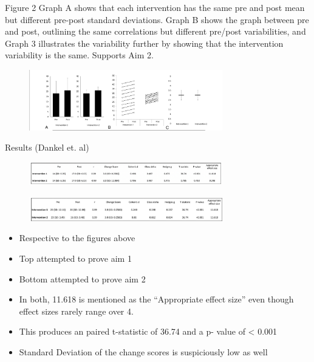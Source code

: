 \documentclass[
  ignorenonframetext,
  aspectratio=169,
]{beamer}
\providecommand{\tightlist}{%
  \setlength{\itemsep}{0pt}\setlength{\parskip}{0pt}}
\begin{document}
\begin{frame}{Figure 2}
\protect\hypertarget{figure-2-1}{}
Graph A shows that each intervention has the same pre and post mean but
different pre-post standard deviations. Graph B shows the graph between
pre and post, outlining the same correlations but different pre/post
variabilities, and Graph 3 illustrates the variability further by
showing that the intervention variability is the same. Supports Aim 2.

\begin{figure}[h]
    \centering
    \includegraphics[width=0.75\textwidth]{fig2.png}
\end{figure}
\end{frame}

\begin{frame}{Results (Dankel et. al)}
\protect\hypertarget{results-dankel-et.-al}{}
\begin{figure}[h]
    \centering
    \includegraphics[width=0.75\textwidth]{figresult1.png}
\end{figure}

\begin{figure}[h]
    \centering
    \includegraphics[width=0.75\textwidth]{figresult2.png}
\end{figure}

\begin{itemize}
\tightlist
\item
  Respective to the figures above
\item
  Top attempted to prove aim 1
\item
  Bottom attempted to prove aim 2
\item
  In both, 11.618 is mentioned as the ``Appropriate effect size'' even
  though effect sizes rarely range over 4.
\item
  This produces an paired t-statistic of 36.74 and a p- value of
  \textless{} 0.001
\item
  Standard Deviation of the change scores is suspiciously low as well
\end{itemize}
\end{frame}
\end{document}

